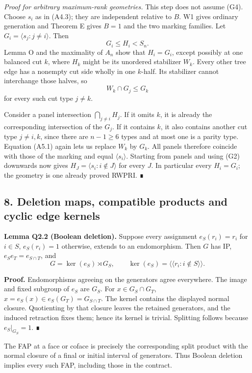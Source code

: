\documentclass[
  10pt,
  letterpaper,
]{article}
\newcounter{none} %
\begin{document}
\emph{Proof for arbitrary maximum-rank geometries.} This step does not
assume (G4). Choose \(s_i\) as in (A4.3); they are independent relative
to \(B\). W1 gives ordinary generation and Theorem E gives \(B=1\) and
the two marking families. Let \(G_i=\langle s_j:j\ne i\rangle\). Then \[
G_i\leq H_i<S_n.
\] Lemma O and the maximality of \(A_n\) show that \(H_i=G_i\), except
possibly at one balanced cut \(k\), where \(H_k\) might be its unordered
stabilizer \(W_k\). Every other tree edge has a nonempty cut side wholly
in one \(k\)-half. Its stabilizer cannot interchange those halves, so \[
W_k\cap G_j\leq G_k
\tag{A5.1}
\] for every such cut type \(j\ne k\).

Consider a panel intersection \(\bigcap_{j\ne i}H_j\). If it omits
\(k\), it is already the corresponding intersection of the \(G_j\). If
it contains \(k\), it also contains another cut type \(j\ne i,k\), since
there are \(n-1\geq6\) types and at most one is a parity type. Equation
(A5.1) again lets us replace \(W_k\) by \(G_k\). All panels therefore
coincide with those of the marking and equal \(\langle s_i\rangle\).
Starting from panels and using (G2) downwards now gives
\(H_J=\langle s_i:i\notin J\rangle\) for every \(J\). In particular
every \(H_i=G_i\); the geometry is one already proved RWPRI. ∎

\subsection{8. Deletion maps, compatible products and cyclic edge
kernels}\label{deletion-maps-compatible-products-and-cyclic-edge-kernels}

\textbf{Lemma Q2.2 (Boolean deletion).} Suppose every assignment
\(e_S(r_i)=r_i\) for \(i\in S\), \(e_S(r_i)=1\) otherwise, extends to an
endomorphism. Then \(G\) has IP, \(e_Se_T=e_{S\cap T}\), and \[
 G=\ker(e_S)\rtimes G_S,
 \qquad \ker(e_S)=\langle\!\langle r_i:i\notin S\rangle\!\rangle.
\]

\textbf{Proof.} Endomorphisms agreeing on the generators agree
everywhere. The image and fixed subgroup of \(e_S\) are \(G_S\). For
\(x\in G_S\cap G_T\), \(x=e_S(x)\in e_S(G_T)=G_{S\cap T}\). The kernel
contains the displayed normal closure. Quotienting by that closure
leaves the retained generators, and the induced retraction fixes them;
hence its kernel is trivial. Splitting follows because \(e_S|_{G_S}=1\).
∎

The FAP at a face or coface is precisely the corresponding split product
with the normal closure of a final or initial interval of generators.
Thus Boolean deletion implies every such FAP, including those in the
contract.
\end{document}

